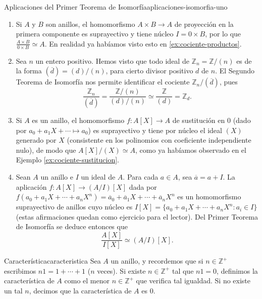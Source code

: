\begin{example}{Aplicaciones del Primer Teorema de Isomorfía}{aplicaciones-isomorfia-uno}
\begin{enumerate}
    \item Si $A$ y $B$ son anillos, el homomorfismo $A \times B \to A$ de proyección en la primera componente es suprayectivo y tiene núcleo $I = 0 \times B$, por lo que $\frac{A \times B}{0 \times B} \simeq A$. En realidad ya habíamos visto esto en \ref{ex:cociente-productos}.
    
    \item Sea $n$ un entero positivo. Hemos visto que todo ideal de $\mathbb{Z}_n = \mathbb{Z}/ (n)$ es de la forma $(\overline{d}) = (d) / (n)$, para cierto divisor positivo $d$ de $n$. El Segundo Teorema de Isomorfía nos permite identificar el cociente $\mathbb{Z}_n/ (\overline{d})$, pues
    \[
    \frac{\mathbb{Z}_n}{(\overline{d})} = \frac{\mathbb{Z}/ (n)}{(d) / (n)} \simeq \frac{\mathbb{Z}}{ (d) } = \mathbb{Z}_d.
    \]
    
    \item Si $A$ es un anillo, el homomorfismo $f : A[X] \to A$ de sustitución en $0$ (dado por $a_0 + a_1 X + \cdots \mapsto a_0$) es suprayectivo y tiene por núcleo el ideal $(X)$ generado por $X$ (consistente en los polinomios con coeficiente independiente nulo), de modo que $A[X]/(X) \simeq A$, como ya habíamos observado en el Ejemplo \ref{ex:cociente-sustitucion}.
    
    \item Sean $A$ un anillo e $I$ un ideal de $A$. Para cada $a \in A$, sea $\overline{a} = a + I$. La aplicación $f : A[X] \to (A/I)[X]$ dada por $f(a_0 + a_1 X + \cdots + a_n X^n) = \overline{a}_0 + \overline{a}_1 X + \cdots + \overline{a}_n X^n$ es un homomorfismo suprayectivo de anillos cuyo núcleo es $I[X] = \{a_0 + a_1 X + \cdots + a_n X^n : a_i \in I\}$ (estas afirmaciones quedan como ejercicio para el lector). Del Primer Teorema de Isomorfía se deduce entonces que
    \[
    \frac{A[X]}{I[X]} \simeq (A/I)[X].
    \]
\end{enumerate}
\end{example}

\begin{definition}{Característica}{caracteristica}
Sea $A$ un anillo, y recordemos que si $n \in \mathbb{Z}^+$ escribimos $n1 = 1 + \cdots + 1$ ($n$ veces). Si existe $n \in \mathbb{Z}^+$ tal que $n1 = 0$, definimos la característica de $A$ como el menor $n \in \mathbb{Z}^+$ que verifica tal igualdad. Si no existe un tal $n$, decimos que la característica de $A$ es $0$.
\end{definition}

